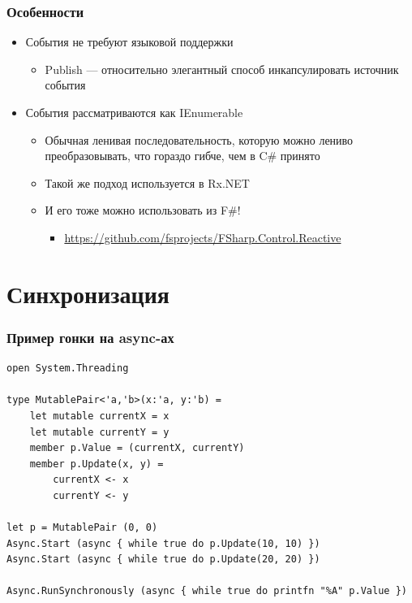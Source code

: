 \documentclass[xetex,mathserif,serif]{beamer}
\begin{document}
    \begin{frame}
        \frametitle{Особенности}
        \begin{itemize}
            \item События не требуют языковой поддержки
            \begin{itemize}
                \item Publish --- относительно элегантный способ инкапсулировать источник события
            \end{itemize}
            \item События рассматриваются как IEnumerable
            \begin{itemize}
                \item Обычная ленивая последовательность, которую можно лениво преобразовывать, что гораздо гибче, чем в C\# принято
                \item Такой же подход используется в Rx.NET
                \item И его тоже можно использовать из F\#!
                \begin{itemize}
                    \item \url{https://github.com/fsprojects/FSharp.Control.Reactive}
                \end{itemize}
            \end{itemize}
        \end{itemize}
    \end{frame}

    \section{Синхронизация}

    \begin{frame}[fragile]
        \frametitle{Пример гонки на async-ах}
        \begin{verbatim}
open System.Threading

type MutablePair<'a,'b>(x:'a, y:'b) =
    let mutable currentX = x
    let mutable currentY = y
    member p.Value = (currentX, currentY)
    member p.Update(x, y) =
        currentX <- x
        currentY <- y

let p = MutablePair (0, 0)
Async.Start (async { while true do p.Update(10, 10) })
Async.Start (async { while true do p.Update(20, 20) })

Async.RunSynchronously (async { while true do printfn "%A" p.Value })
        \end{verbatim}
    \end{frame}
\end{document}
